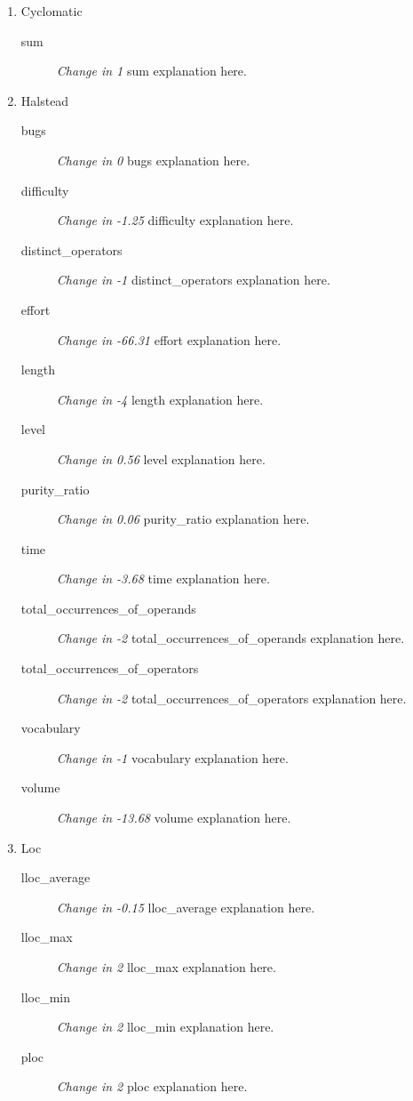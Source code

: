 \begin{enumerate}
  \item Cyclomatic
        \begin{description}
          \item [sum] \textit{Change in 1} sum explanation here.
        \end{description}
  \item Halstead
        \begin{description}
          \item [bugs] \textit{Change in 0} bugs explanation here.
          \item [difficulty] \textit{Change in -1.25} difficulty explanation here.
          \item [distinct\_operators] \textit{Change in -1} distinct\_operators explanation here.
          \item [effort] \textit{Change in -66.31} effort explanation here.
          \item [length] \textit{Change in -4} length explanation here.
          \item [level] \textit{Change in 0.56} level explanation here.
          \item [purity\_ratio] \textit{Change in 0.06} purity\_ratio explanation here.
          \item [time] \textit{Change in -3.68} time explanation here.
          \item [total\_occurrences\_of\_operands] \textit{Change in -2} total\_occurrences\_of\_operands explanation here.
          \item [total\_occurrences\_of\_operators] \textit{Change in -2} total\_occurrences\_of\_operators explanation here.
          \item [vocabulary] \textit{Change in -1} vocabulary explanation here.
          \item [volume] \textit{Change in -13.68} volume explanation here.
        \end{description}
  \item Loc
        \begin{description}
          \item [lloc\_average] \textit{Change in -0.15} lloc\_average explanation here.
          \item [lloc\_max] \textit{Change in 2} lloc\_max explanation here.
          \item [lloc\_min] \textit{Change in 2} lloc\_min explanation here.
          \item [ploc] \textit{Change in 2} ploc explanation here.

\end{description}
\end{enumerate}
